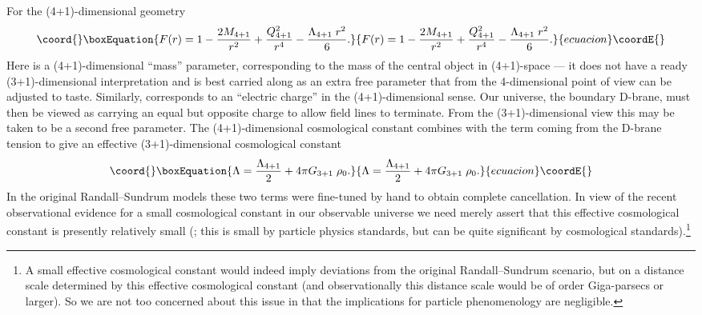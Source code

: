 \documentclass[a4paper,12pt]{article}
\def\lsim{\mathrel{\lower2.5pt\vbox{\lineskip=0pt\baselineskip=0pt
          \hbox{\myHighlight{$<$}\coordHE{}}\hbox{\myHighlight{$\sim$}\coordHE{}}}}}
\begin{document}
For the (4+1)-dimensional {\RNdS} geometry
%
\begin{equation}\coord{}\boxEquation{
F(r) = 1 - {2M_{4+1}\over r^2} 
+ {Q_{4+1}^2\over r^4} - {\Lambda_{4+1} \; r^2\over 6}.
}{
F(r) = 1 - {2M_{4+1}\over r^2} 
+ {Q_{4+1}^2\over r^4} - {\Lambda_{4+1} \; r^2\over 6}.
}{ecuacion}\coordE{}\end{equation}
%
Here \coordHE{} is a (4+1)-dimensional ``mass'' parameter,
corresponding to the mass of the central object in (4+1)-space --- it
does not have a ready (3+1)-dimensional interpretation and is best
carried along as an extra free parameter that from the 4-dimensional
point of view can be adjusted to taste. Similarly, \coordHE{}
corresponds to an ``electric charge'' in the (4+1)-dimensional
sense. Our universe, the boundary D-brane, must then be viewed as
carrying an equal but opposite charge to allow field lines to
terminate. From the (3+1)-dimensional view this may be taken to be a
second free parameter. The (4+1)-dimensional cosmological constant
combines with the term coming from the D-brane tension to give an
effective (3+1)-dimensional cosmological constant
%
\begin{equation}\coord{}\boxEquation{
\Lambda = {\Lambda_{4+1}\over2} + 4\pi G_{3+1}\; \rho_0.
}{
\Lambda = {\Lambda_{4+1}\over2} + 4\pi G_{3+1}\; \rho_0.
}{ecuacion}\coordE{}\end{equation}
%
In the original Randall--Sundrum models these two terms were
fine-tuned by hand to obtain complete cancellation. In view of the
recent observational evidence for a small cosmological constant in our
observable universe we need merely assert that this effective
cosmological constant is presently relatively small (\myHighlight{$\Lambda \lsim
8\pi G_{3+1}\; \rho_\critical$}\coordHE{}; this is small by particle physics
standards, but can be quite significant by cosmological
standards).\footnote{
A small effective cosmological constant would indeed imply deviations
from the original Randall--Sundrum scenario, but on a distance scale
determined by this effective cosmological constant (and observationally
this distance scale would be of order Giga-parsecs or larger). So we
are not too concerned about this issue in that the implications for
particle phenomenology are negligible.}
\end{document}
